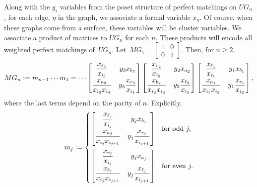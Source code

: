 Along with the $y_i$ variables from the poset structure of perfect matchings on $UG_n$, for each edge, $\eta$ in the graph, we associate a formal variable $x_\eta$. Of course, when these graphs come from a surface, these variables will be cluster variables. We associate a product of matrices to $UG_n$ for each $n$. These products will encode all weighted perfect matchings of~$UG_n$. Let~$MG_1 = \left[\begin{smallmatrix} 1 &0 \\ 0 & 1 \end{smallmatrix}\right]$. Then, for $n \geq 2$,
\[
MG_n := m_{n-1}\cdots m_1 = \cdots \begin{bmatrix} \dfrac{x_{\ell_3}}{x_{i_3}} & y_3 x_{b_3} \vspace{1mm}\\ \dfrac{x_{a_3}}{x_{i_3}x_{i_4}} & y_3 \dfrac{x_{r_3}}{x_{i_4}} \end{bmatrix} \begin{bmatrix}\dfrac{x_{r_2}}{x_{i_2}} & y_2 x_{a_2} \vspace{1mm}\\ \dfrac{x_{b_2}}{x_{i_2}x_{i_3}} & y_2 \dfrac{x_{\ell_2}}{x_{i_3}} \end{bmatrix} \begin{bmatrix} \dfrac{x_{\ell_1}}{x_{i_1}} & y_1 x_{b_1} \vspace{1mm}\\ \dfrac{x_{a_1}}{x_{i_1}x_{i_2}} & y_1 \dfrac{x_{r_1}}{x_{i_2}} \end{bmatrix},
\]
where the last terms depend on the parity of $n$. Explicitly,
\begin{gather*}
 m_j := \begin{cases}
 \begin{bmatrix} \dfrac{x_{\ell_j}}{x_{i_j}} & y_jx_{b_j} \vspace{1mm}\\ \dfrac{x_{a_j}}{x_{i_j}x_{i_{j+1}}} & y_j\dfrac{x_{r_j}}{x_{i_{j+1}}} \end{bmatrix} & \text{for odd } j, \vspace{2mm} \\
\begin{bmatrix} \dfrac{x_{r_j}}{x_{i_j}} & y_jx_{a_j} \vspace{1mm}\\ \dfrac{x_{b_j}}{x_{i_j}x_{i_{j+1}}} & y_j\dfrac{x_{\ell_j}}{x_{i_{j+1}}} \end{bmatrix} & \text{for even }j.
 \end{cases}
\end{gather*}

